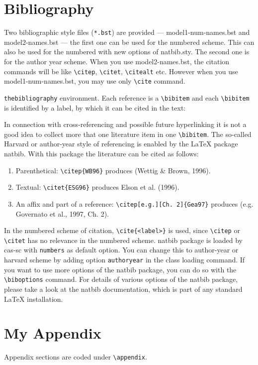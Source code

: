\documentclass[a4paper,fleqn]{cas-sc}
\begin{document}
\section{Bibliography}

Two bibliographic style files (\verb+*.bst+) are provided ---
{model1-num-names.bst} and {model2-names.bst} --- the first one can be
used for the numbered scheme. This can also be used for the numbered
with new options of {natbib.sty}. The second one is for the author year
scheme. When  you use model2-names.bst, the citation commands will be
like \verb+\citep+,  \verb+\citet+, \verb+\citealt+ etc. However when
you use model1-num-names.bst, you may use only \verb+\cite+ command.

\verb+thebibliography+ environment.  Each reference is a
\verb+\bibitem+ and each \verb+\bibitem+ is identified by a label,
by which it can be cited in the text:

\noindent In connection with cross-referencing and
possible future hyperlinking it is not a good idea to collect
more that one literature item in one \verb+\bibitem+.  The
so-called Harvard or author-year style of referencing is enabled
by the \LaTeX{} package {natbib}. With this package the
literature can be cited as follows:


\begin{enumerate}[\textbullet]
\item Parenthetical: \verb+\citep{WB96}+ produces (Wettig \& Brown, 1996).
\item Textual: \verb+\citet{ESG96}+ produces Elson et al. (1996).
\item An affix and part of a reference:
\verb+\citep[e.g.][Ch. 2]{Gea97}+ produces (e.g. Governato et
al., 1997, Ch. 2).
\end{enumerate}

In the numbered scheme of citation, \verb+\cite{<label>}+ is used,
since \verb+\citep+ or \verb+\citet+ has no relevance in the numbered
scheme.  {natbib} package is loaded by {cas-sc} with
\verb+numbers+ as default option.  You can change this to author-year
or harvard scheme by adding option \verb+authoryear+ in the class
loading command.  If you want to use more options of the {natbib}
package, you can do so with the \verb+\biboptions+ command.  For
details of various options of the {natbib} package, please take a
look at the {natbib} documentation, which is part of any standard
\LaTeX{} installation.

\appendix
\section{My Appendix}
Appendix sections are coded under \verb+\appendix+.
\end{document}
